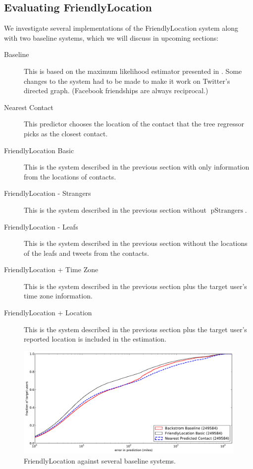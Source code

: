\documentclass[letterpaper]{article}
\DeclareMathOperator{\pStrangers}{pStrangers}
\begin{document}
\subsection{Evaluating FriendlyLocation}
We investigate several implementations of the FriendlyLocation system along
with two baseline systems, which we will discuss in upcoming sections:
\begin{description}
\item[Baseline] This is based on the maximum likelihood estimator presented in
    \cite{backstrom2010find}. Some changes to the system had to be made to make it
    work on Twitter's directed graph. (Facebook friendships are always
    reciprocal.)
\item[Nearest Contact] This predictor chooses the location of the contact that
    the tree regressor picks as the closest contact.
\item[FriendlyLocation Basic] This is the system described in the previous
    section with only information from the locations of contacts.
\item[FriendlyLocation - Strangers] This is the system described in the previous
    section without $\pStrangers$.
\item[FriendlyLocation - Leafs] This is the system described in the previous
    section without the locations of the leafs and tweets from the contacts.
\ifdefined\THESIS
\item[FriendlyLocation + Time Zone] This is the system described in the previous
    section plus the target user's time zone information.
\item[FriendlyLocation + Location] This is the system described in the previous
    section plus the target user's reported location is included in the
    estimation.
\fi
\end{description}

\begin{figure}[tb]
\centering
\includegraphics[width=\linewidth]{figures/fl_basic.pdf}
\caption{
    FriendlyLocation against several baseline systems.
}
\label{fig:results}
\end{figure}
\end{document}
